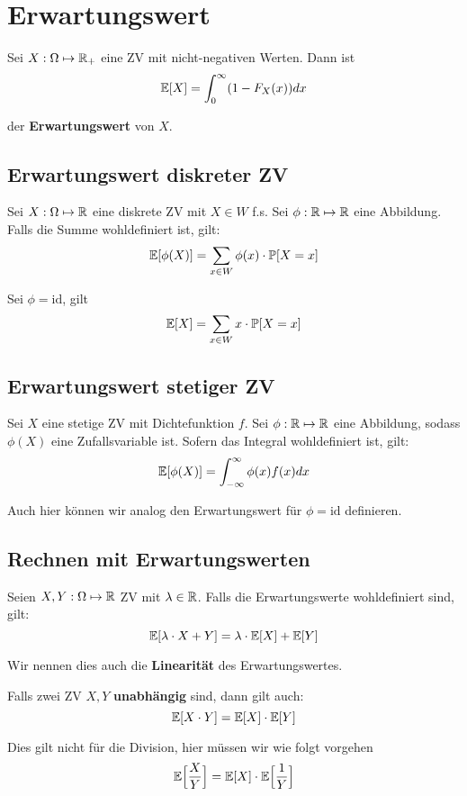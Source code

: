 \section{Erwartungswert}


Sei $X: \Omega \mapsto \mathbb{R}_+$ eine ZV mit nicht-negativen Werten. Dann ist 
$$\mathbb{E}[X] = \int_0^\infty (1 - F_X(x))dx$$
    
der \textbf{Erwartungswert} von $X$.


\subsection{Erwartungswert diskreter ZV}

Sei $X: \Omega \mapsto \mathbb{R}$ eine diskrete ZV mit $X \in W$ f.s. Sei $\phi: \mathbb{R} \mapsto \mathbb{R}$ eine Abbildung. Falls die Summe wohldefiniert ist, gilt:
$$\mathbb{E}[\phi(X)] = \sum_{x \in W} \phi(x) \cdot \mathbb{P}[X = x]$$

Sei $\phi = \text{id}$, gilt 
$$\mathbb{E}[X] = \sum_{x \in W} x \cdot \mathbb{P}[X = x]$$


\subsection{Erwartungswert stetiger ZV}

Sei $X$ eine stetige ZV mit Dichtefunktion $f$. Sei $\phi: \mathbb{R} \mapsto \mathbb{R}$ eine Abbildung, sodass $\phi(X)$ eine Zufallsvariable ist. Sofern das Integral wohldefiniert ist, gilt:
$$\mathbb{E}[\phi(X)] = \int_{-\infty}^\infty \phi(x)f(x)dx$$

 Auch hier können wir analog den Erwartungswert für $\phi = \text{id}$ definieren.


\subsection{Rechnen mit Erwartungswerten}

\begin{mainbox}{}
    Seien $X,Y: \Omega \mapsto \mathbb{R}$ ZV mit $\lambda \in \mathbb{R}$. Falls die Erwartungswerte wohldefiniert sind, gilt:    
    $$\mathbb{E}[\lambda \cdot X + Y] = \lambda \cdot \mathbb{E}[X] + \mathbb{E}[Y]$$
    
    Wir nennen dies auch die \textbf{Linearität} des Erwartungswertes.
\end{mainbox}

Falls zwei ZV $X,Y$ \textbf{unabhängig} sind, dann gilt auch:
$$\mathbb{E}[X \cdot Y] = \mathbb{E}[X] \cdot \mathbb{E}[Y]$$

Dies gilt nicht für die Division, hier müssen wir wie folgt vorgehen
$$\mathbb{E} \Big[ \frac{X}{Y} \Big] = \mathbb{E}[X] \cdot \mathbb{E} \Big[ \frac{1}{Y} \Big]$$

